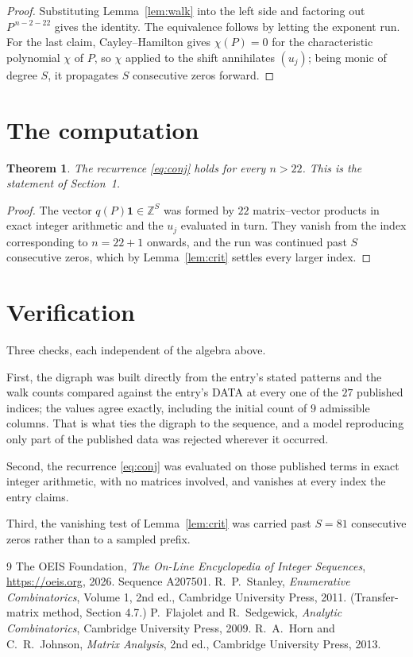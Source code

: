 \documentclass[11pt,a4paper]{article}
\theoremstyle{plain}
\newtheorem{theorem}{Theorem}
\theoremstyle{definition}
\begin{document}
\begin{proof}
Substituting Lemma~\ref{lem:walk} into the left side and factoring out
$P^{\,n-2-22}$ gives the identity. The equivalence follows by letting the exponent
run. For the last claim, Cayley--Hamilton gives $\chi(P)=0$ for the characteristic
polynomial $\chi$ of $P$, so $\chi$ applied to the shift annihilates $(u_j)$; being monic of
degree $S$, it propagates $S$ consecutive zeros forward.
\end{proof}

\section{The computation}

\begin{theorem}
The recurrence \eqref{eq:conj} holds for every $n>22$. This is the statement of
Section~1.
\end{theorem}

\begin{proof}
The vector $q(P)\mathbf{1}\in\mathbb{Z}^{S}$ was formed by $22$ matrix--vector
products in exact integer arithmetic and the $u_j$ evaluated in turn. They vanish from the
index corresponding to $n=22+1$ onwards, and the run was continued past $S$ consecutive
zeros, which by Lemma~\ref{lem:crit} settles every larger index.
\end{proof}

\section{Verification}

Three checks, each independent of the algebra above.

First, the digraph was built directly from the entry's stated patterns and the walk counts
compared against the entry's DATA at every one of the $27$ published indices; the
values agree exactly, including the initial count of $9$ admissible columns. That is
what ties the digraph to the sequence, and a model reproducing only part of the published
data was rejected wherever it occurred.

Second, the recurrence \eqref{eq:conj} was evaluated on those published terms in exact
integer arithmetic, with no matrices involved, and vanishes at every index the entry claims.

Third, the vanishing test of Lemma~\ref{lem:crit} was carried past $S=81$ consecutive
zeros rather than to a sampled prefix.

\begin{thebibliography}{9}
 The OEIS Foundation, \emph{The On-Line Encyclopedia of Integer
Sequences}, \url{https://oeis.org}, 2026. Sequence A207501.
 R.~P.~Stanley, \emph{Enumerative Combinatorics}, Volume 1, 2nd ed.,
Cambridge University Press, 2011. (Transfer-matrix method, Section 4.7.)
 P.~Flajolet and R.~Sedgewick, \emph{Analytic Combinatorics}, Cambridge
University Press, 2009.
 R.~A.~Horn and C.~R.~Johnson, \emph{Matrix Analysis}, 2nd ed., Cambridge
University Press, 2013.
\end{thebibliography}
\end{document}
